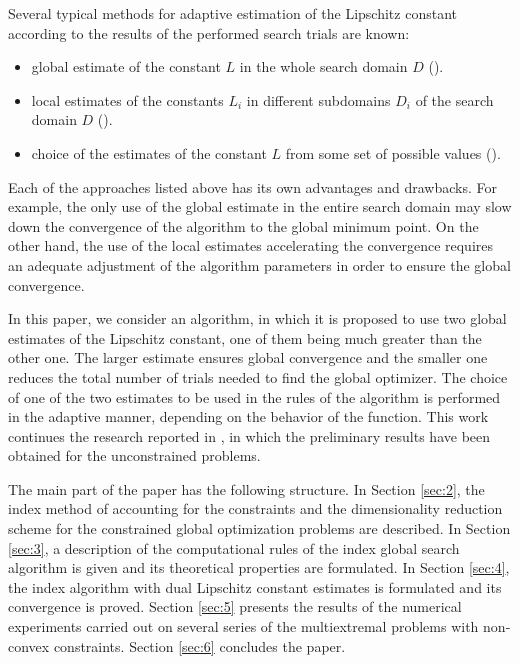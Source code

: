 \documentclass[twocolumn]{svjour3}          %
\begin{document}
		Several typical methods for adaptive estimation of the Lipschitz constant according to the results of the performed search trials are known:
\begin{itemize}
\item global estimate of the constant $L$ in the whole search domain $D$ (\cite{Strongin2000,Pinter1996,Horst1996}).
\item local estimates of the constants $L_i$ in different subdomains $D_i$ of the search domain $D$ (\cite{Sergeyev1998,Kvasov2003,Sergeyev2010,Sergeyev2016}).
\item choice of the estimates of the constant $L$ from some set of possible values (\cite{Jones2009,Jones1993,Gablonsky2001,Sergeyev2006}).
\end{itemize}

	Each of the approaches listed above has its own advantages and drawbacks. For example, the only use of the global estimate in the entire search domain may slow down the convergence of the algorithm to the global minimum point. On the other hand, the use of the local estimates accelerating the convergence requires an adequate adjustment of the algorithm parameters in order to ensure the global convergence. 

	In this paper, we consider an algorithm, in which it is proposed to use two global estimates of the Lipschitz constant, one of them being much greater than the other one. The larger estimate ensures global convergence and the smaller one reduces the total number of trials needed to find the global optimizer. The choice of one of the two estimates to be used in the rules of the algorithm is performed in the adaptive manner, depending on the behavior of the function. This work continues the research reported in \cite{NUMTA2019}, in which the preliminary results have been obtained for the unconstrained problems.
	
	The main part of the paper has the following structure. In Section \ref{sec:2}, the index method of accounting for the constraints and the dimensionality reduction scheme for the constrained global optimization problems are described. In Section \ref{sec:3}, a description of the computational rules of the index global search algorithm is given and its theoretical properties are formulated. In Section \ref{sec:4}, the index algorithm with dual Lipschitz constant estimates is formulated and its convergence is proved. Section \ref{sec:5} presents the results of the numerical experiments carried out on several series of the multiextremal problems with non-convex constraints. Section \ref{sec:6} concludes the paper.
\end{document}

